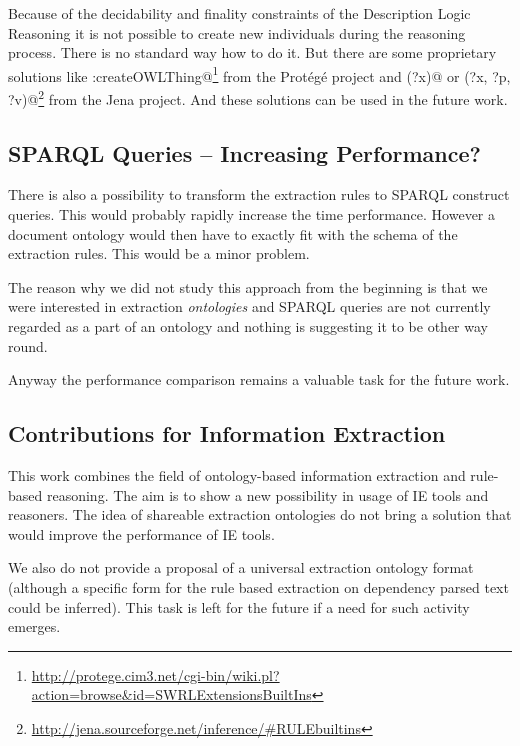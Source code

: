 Because of the decidability and finality constraints of the Description Logic Reasoning it is not possible to create new individuals during the reasoning process. There is no standard way how to do it. But there are some proprietary solutions like \verb@swrlx:createOWLThing@\footnote{\url{http://protege.cim3.net/cgi-bin/wiki.pl?action=browse&id=SWRLExtensionsBuiltIns}} from the Prot\'{e}g\'{e} project and \verb@makeTemp(?x)@ or \verb@makeInstance(?x, ?p, ?v)@\footnote{\url{http://jena.sourceforge.net/inference/#RULEbuiltins}} from the Jena project.
And these solutions can be used in the future work. 

\subsection{SPARQL Queries -- Increasing Performance?}

There is also a possibility to transform the extraction rules to SPARQL construct queries. This would probably rapidly increase the time performance. However a document ontology would then have to exactly fit with the schema of the extraction rules.  This would be a minor problem. 

The reason why we did not study this approach from the beginning is that we were interested in extraction \emph{ontologies} and SPARQL queries are not currently regarded as a part of an ontology and nothing is suggesting it to be other way round.  

Anyway the performance comparison remains a valuable task for the future work.

\subsection{Contributions for Information Extraction}

This work combines the field of ontology-based information extraction and rule-based reasoning. The aim is to show a new possibility in usage of IE tools and reasoners. The idea of shareable extraction ontologies do not bring a solution that would improve the performance of IE tools.

We also do not provide a proposal of a universal extraction ontology format (although a specific form for the rule based extraction on dependency parsed text could be inferred). This task is left for the future if a need for such activity emerges.



